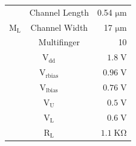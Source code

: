 \begin{table}[!b]
\begin{tabular}{c|c|r}
                    \hline
                    &   Channel Length   &   0.54 $\mathrm{\mu m}$   \\
                    \cline{2-3}
                    $\mathrm{M_{L}}$   &   Channel Width   &   17 $\mathrm{\mu m}$   \\
                    \cline{2-3}
                        &   Multifinger   & 10    \\
                    \hline
                    \multicolumn{2}{c|}{$\mathrm{V_{dd}}$} &   $1.8\;\mathrm{V}$   \\
                    \hline
                    \multicolumn{2}{c|}{$\mathrm{V_{rbias}}$} &   $0.96\;\mathrm{V}$   \\
                    \hline
                    \multicolumn{2}{c|}{$\mathrm{V_{lbias}}$} &   $0.76\;\mathrm{V}$   \\
                    \hline
                    \multicolumn{2}{c|}{$\mathrm{V_{U}}$} &   $0.5\;\mathrm{V}$   \\
                    \hline
                    \multicolumn{2}{c|}{$\mathrm{V_{L}}$} &   $0.6\;\mathrm{V}$   \\
                    \hline
                    \multicolumn{2}{c|}{$\mathrm{R_{L}}$} &   $1.1\;\mathrm{K \Omega}$   \\
                    \hline
                \end{tabular}
            \end{table}
          



